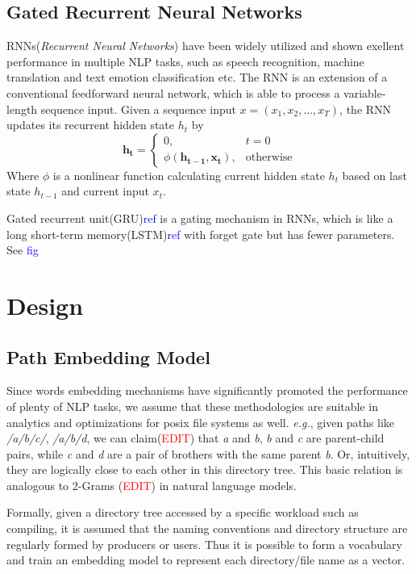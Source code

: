 \documentclass[conference]{IEEEtran}
\begin{document}
\subsection{Gated Recurrent Neural Networks}
RNNs(\textit{Recurrent Neural Networks}) have been widely utilized and shown exellent performance in multiple NLP tasks,
such as speech recognition, machine translation and text emotion classification etc.
The RNN is an extension of a conventional feedforward neural network, which is able to process a variable-length sequence input.
Given a sequence input $x = (x_1, x_2, \dots, x_T)$, the RNN updates its recurrent hidden state $h_t$ by
\begin{equation}
    \mathbf{h_t}=
        \begin{cases}
            0, &t=0 \\
            \phi(\mathbf{h_{t-1}, \mathbf{x_t}}), &\text{otherwise}
        \end{cases}
\end{equation}
Where $\phi$ is a nonlinear function calculating current hidden state $h_t$ based on last state $h_{t-1}$ and current input $x_t$.

Gated recurrent unit(GRU)\textcolor{blue}{ref} is a gating mechanism in RNNs, 
which is like a long short-term memory(LSTM)\textcolor{blue}{ref} with forget gate but has fewer parameters.
See \textcolor{blue}{fig} 



\section{Design}
\subsection{Path Embedding Model}
Since words embedding mechanisms have significantly promoted the performance of plenty of NLP tasks, 
we assume that these methodologies are suitable in analytics and optimizations for posix file systems as well.
\textit{e.g.}, given paths like \textit{/a/b/c/}, \textit{/a/b/d}, we can claim(\textcolor{red}{EDIT}) that \textit{a} and \textit{b},
\textit{b} and \textit{c} are parent-child pairs, while \textit{c} and \textit{d} are a pair of brothers with the same parent \textit{b}.
Or, intuitively, they are logically close to each other in this directory tree. 
This basic relation is analogous to 2-Grams (\textcolor{red}{EDIT}) in natural language models.

Formally, given a directory tree accessed by a specific workload such as compiling, 
it is assumed that the naming conventions and directory structure are regularly formed by producers or users.
Thus it is possible to form a vocabulary and train an embedding model to represent each directory/file name as a vector.
\end{document}
